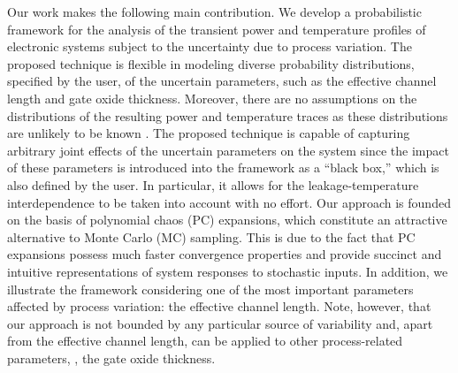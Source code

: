 
Our work makes the following main contribution.
We develop a probabilistic framework for the analysis of the transient power and temperature profiles of electronic systems subject to the uncertainty due to process variation.
The proposed technique is flexible in modeling diverse probability distributions, specified by the user, of the uncertain parameters, such as the effective channel length and gate oxide thickness.
Moreover, there are no assumptions on the distributions of the resulting power and temperature traces as these distributions are unlikely to be known \apriori.
The proposed technique is capable of capturing arbitrary joint effects of the uncertain parameters on the system since the impact of these parameters is introduced into the framework as a ``black box,'' which is also defined by the user.
In particular, it allows for the leakage-temperature interdependence to be taken into account with no effort.
Our approach is founded on the basis of polynomial chaos (PC) expansions, which constitute an attractive alternative to Monte Carlo (MC) sampling.
This is due to the fact that PC expansions possess much faster convergence properties and provide succinct and intuitive representations of system responses to stochastic inputs.
In addition, we illustrate the framework considering one of the most important parameters affected by process variation: the effective channel length.
Note, however, that our approach is not bounded by any particular source of variability and, apart from the effective channel length, can be applied to other process-related parameters, \eg, the gate oxide thickness.
